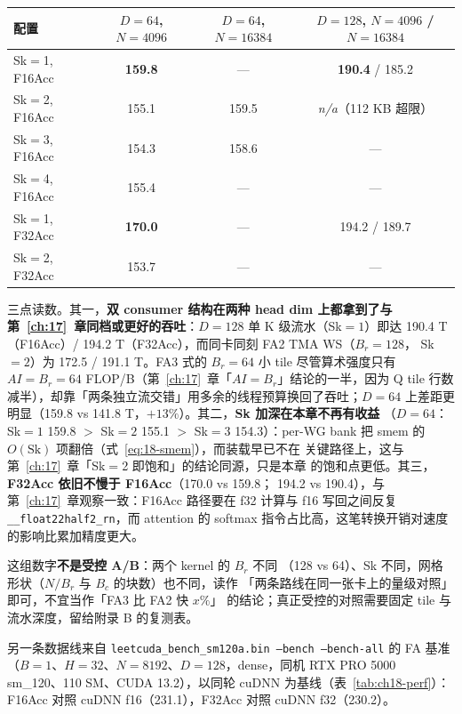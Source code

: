 \begin{center}
\begin{tabular}{lccc}
\toprule
配置 & $D{=}64$, $N{=}4096$ & $D{=}64$, $N{=}16384$ & $D{=}128$, $N{=}4096$ / $N{=}16384$ \\
\midrule
Sk$=$1, F16Acc & \textbf{159.8} & — & \textbf{190.4} / 185.2 \\
Sk$=$2, F16Acc & 155.1 & 159.5 & \emph{n/a}（112 KB 超限）\\
Sk$=$3, F16Acc & 154.3 & 158.6 & — \\
Sk$=$4, F16Acc & 155.4 & — & — \\
Sk$=$1, F32Acc & \textbf{170.0} & — & 194.2 / 189.7 \\
Sk$=$2, F32Acc & 153.7 & — & — \\
\bottomrule
\end{tabular}
\end{center}

三点读数。其一，\textbf{双 consumer 结构在两种 head dim 上都拿到了与
第~\ref{ch:17}~章同档或更好的吞吐}：$D{=}128$ 单 K 级流水（Sk$=1$）即达
190.4 T（F16Acc）/ 194.2 T（F32Acc），而同卡同刻 FA2 TMA WS（$B_r{=}128$，
Sk$=2$）为 172.5 / 191.1 T。FA3 式的 $B_r{=}64$ 小 tile 尽管算术强度只有
$AI = B_r = 64$ FLOP/B（第~\ref{ch:17}~章「$AI = B_r$」结论的一半，因为
Q tile 行数减半），却靠「两条独立流交错」用多余的线程预算换回了吞吐；$D{=}64$
上差距更明显（159.8 vs 141.8 T，$+13\%$）。其二，\textbf{Sk 加深在本章不再有收益}
（$D{=}64$：Sk$=1$ 159.8 $>$ Sk$=2$ 155.1 $>$ Sk$=3$ 154.3）：per-WG bank
把 smem 的 $O(\mathrm{Sk})$ 项翻倍（式~\ref{eq:18-smem}），而装载早已不在
关键路径上，这与第~\ref{ch:17}~章「Sk$=$2 即饱和」的结论同源，只是本章
的饱和点更低。其三，\textbf{F32Acc 依旧不慢于 F16Acc}（170.0 vs 159.8；
194.2 vs 190.4），与第~\ref{ch:17}~章观察一致：F16Acc 路径要在 f32 计算与
f16 写回之间反复 \texttt{\_\allowbreak{}\_\allowbreak{}float22half2\_\allowbreak{}rn}，而 attention 的 softmax
指令占比高，这笔转换开销对速度的影响比累加精度更大。

这组数字\textbf{不是受控 A/B}：两个 kernel 的 $B_r$ 不同
（128 vs 64）、Sk 不同，网格形状（$N/B_r$ 与 $B_c$ 的块数）也不同，读作
「两条路线在同一张卡上的量级对照」即可，不宜当作「FA3 比 FA2 快 $x\%$」
的结论；真正受控的对照需要固定 tile 与流水深度，留给附录 B 的复测表。

另一条数据线来自 \texttt{leetcuda\_\allowbreak{}bench\_\allowbreak{}sm120a.bin --bench --bench-all} 的
FA 基准（$B{=}1$、$H{=}32$、$N{=}8192$、$D{=}128$，dense，同机 RTX PRO 5000
sm\_120、110 SM、CUDA 13.2），以同轮 cuDNN 为基线（表~\ref{tab:ch18-perf}）：
F16Acc 对照 cuDNN f16（231.1），F32Acc 对照 cuDNN f32（230.2）。

